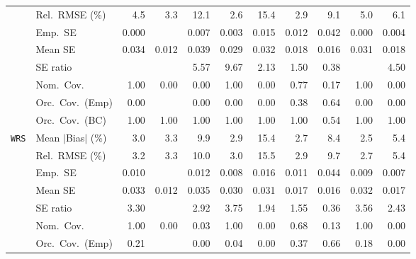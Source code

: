\begin{landscape}
\begin{longtable}{llrrrrrrrrr}
 & Rel.\ RMSE (\%) & 4.5 & \cellcolor{rankthree}3.3 & 12.1 & \cellcolor{rankone}2.6 & 15.4 & \cellcolor{ranktwo}2.9 & 9.1 & 5.0 & 6.1 \\
 & Emp.\ SE & 0.000 &  & 0.007 & 0.003 & 0.015 & 0.012 & 0.042 & 0.000 & 0.004 \\
 & Mean SE & 0.034 & 0.012 & 0.039 & 0.029 & 0.032 & 0.018 & 0.016 & 0.031 & 0.018 \\
 & SE ratio &  &  & 5.57 & 9.67 & \cellcolor{rankthree}2.13 & \cellcolor{rankone}1.50 & \cellcolor{ranktwo}0.38 &  & 4.50 \\
 & Nom.\ Cov. & \cellcolor{rankone}1.00 & 0.00 & 0.00 & \cellcolor{rankone}1.00 & 0.00 & \cellcolor{ranktwo}0.77 & \cellcolor{rankthree}0.17 & \cellcolor{rankone}1.00 & 0.00 \\
 & Orc.\ Cov.\ (Emp) & \cellcolor{rankthree}0.00 &  & \cellcolor{rankthree}0.00 & \cellcolor{rankthree}0.00 & \cellcolor{rankthree}0.00 & \cellcolor{ranktwo}0.38 & \cellcolor{rankone}0.64 & \cellcolor{rankthree}0.00 & \cellcolor{rankthree}0.00 \\
 & Orc.\ Cov.\ (BC) & \cellcolor{rankone}1.00 & \cellcolor{rankone}1.00 & \cellcolor{rankone}1.00 & \cellcolor{rankone}1.00 & \cellcolor{rankone}1.00 & \cellcolor{rankone}1.00 & \cellcolor{ranktwo}0.54 & \cellcolor{rankone}1.00 & \cellcolor{rankone}1.00 \\
\addlinespace[2pt]
\quad \texttt{WRS} & Mean $|$Bias$|$ (\%) & 3.0 & 3.3 & 9.9 & \cellcolor{rankthree}2.9 & 15.4 & \cellcolor{ranktwo}2.7 & 8.4 & \cellcolor{rankone}2.5 & 5.4 \\
 & Rel.\ RMSE (\%) & 3.2 & 3.3 & 10.0 & \cellcolor{rankthree}3.0 & 15.5 & \cellcolor{ranktwo}2.9 & 9.7 & \cellcolor{rankone}2.7 & 5.4 \\
 & Emp.\ SE & 0.010 &  & 0.012 & 0.008 & 0.016 & 0.011 & 0.044 & 0.009 & 0.007 \\
 & Mean SE & 0.033 & 0.012 & 0.035 & 0.030 & 0.031 & 0.017 & 0.016 & 0.032 & 0.017 \\
 & SE ratio & 3.30 &  & 2.92 & 3.75 & \cellcolor{rankthree}1.94 & \cellcolor{rankone}1.55 & \cellcolor{ranktwo}0.36 & 3.56 & 2.43 \\
 & Nom.\ Cov. & \cellcolor{rankone}1.00 & 0.00 & 0.03 & \cellcolor{rankone}1.00 & 0.00 & \cellcolor{ranktwo}0.68 & \cellcolor{rankthree}0.13 & \cellcolor{rankone}1.00 & 0.00 \\
 & Orc.\ Cov.\ (Emp) & \cellcolor{rankthree}0.21 &  & 0.00 & 0.04 & 0.00 & \cellcolor{ranktwo}0.37 & \cellcolor{rankone}0.66 & 0.18 & 0.00 \\

\end{longtable}
\end{landscape}
